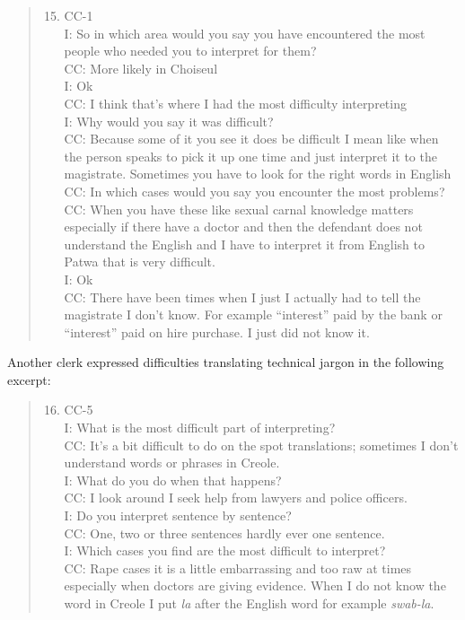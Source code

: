 \documentclass[output=paper,colorlinks,citecolor=brown]{langscibook}
\begin{document}
\begin{quote}
    \begin{enumerate}
    \setcounter{enumi}{14}    
        \item CC-1 \\
         I: So in which area would you say you have encountered the most people who needed  you to interpret for them? \\
         CC: More likely in Choiseul \\
         I: Ok \\
         CC: I think that’s where I had the most difficulty interpreting \\
         I: Why would you say it was difficult? \\
         CC: Because some of it you see it does be difficult I mean like when the person speaks to pick it up one time and just interpret it to the magistrate. Sometimes you have to look for the right words in English \\
        CC: In which cases would you say you encounter the most problems? \\
        CC: When you have these like sexual carnal knowledge matters especially if there have a doctor and then the defendant does not understand the English and I have to interpret it from English to Patwa that is very difficult. \\
        I: Ok \\
        CC: There have been times when I just I actually had to tell the magistrate I don’t know. For example “interest” paid by the bank or “interest” paid on hire purchase. I just did not know it.
    \end{enumerate}
\end{quote}

Another clerk expressed difficulties translating technical jargon in the following excerpt:

\begin{quote}
    \begin{enumerate}
    \setcounter{enumi}{15}     
        \item CC-5 \\
         I: What is the most difficult part of interpreting? \\
         CC: It’s a bit difficult to do on the spot translations; sometimes I don’t understand words or phrases in Creole. \\ 
         I: What do you do when that happens? \\
         CC: I look around I seek help from lawyers and police officers. \\
         I: Do you interpret sentence by sentence? \\
         CC: One, two or three sentences hardly ever one sentence. \\
         I: Which cases you find are the most difficult to interpret? \\
         CC: Rape cases it is a little embarrassing and too raw at times especially when doctors are giving evidence. When I do not know the word in Creole I put \textit{la} after the English word for example \textit{swab-la}.
    \end{enumerate}
\end{quote}
\end{document}

